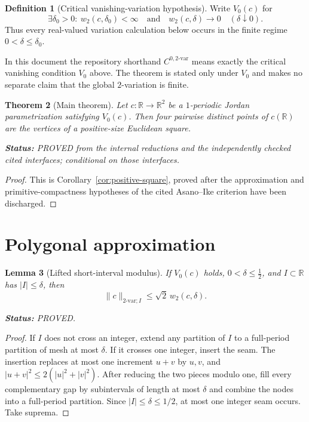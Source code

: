 \documentclass[11pt]{article}
\newtheorem{theorem}{Theorem}
\newtheorem{lemma}[theorem]{Lemma}
\theoremstyle{definition}
\newtheorem{definition}[theorem]{Definition}
\theoremstyle{remark}
\newcommand{\R}{\mathbb R}
\newcommand{\status}[1]{\par\smallskip\noindent\textbf{Status:}
  \begingroup\small\sffamily #1.\endgroup\par\smallskip}
\begin{document}
\begin{definition}[Critical vanishing-variation hypothesis]
Write $V_0(c)$ for
\[
 \exists\delta_0>0:\ w_2(c,\delta_0)<\infty
 \quad\text{and}\quad w_2(c,\delta)\longrightarrow0
                 \quad(\delta\downarrow0).
\]
Thus every real-valued variation calculation below occurs in the finite
regime $0<\delta\leq\delta_0$.
\end{definition}

In this document the repository shorthand $C^{0,2\text{-var}}$ means exactly
the critical vanishing condition $V_0$ above.  The theorem is stated only
under $V_0$ and makes no separate claim that the global $2$-variation is
finite.

\begin{theorem}[Main theorem]\label{thm:main}
Let $c\colon\R\to\R^2$ be a $1$-periodic Jordan parametrization satisfying
$V_0(c)$.  Then four pairwise distinct points of $c(\R)$ are the vertices of a
positive-size Euclidean square.
\status{PROVED from the internal reductions and the independently checked
cited interfaces; conditional on those interfaces}
\end{theorem}

\begin{proof}
This is Corollary~\ref{cor:positive-square}, proved after the
approximation and primitive-compactness hypotheses of the cited
Asano--Ike criterion have been discharged.
\end{proof}

\section{Polygonal approximation}

\begin{lemma}[Lifted short-interval modulus]\label{lem:local-modulus}
If $V_0(c)$ holds, $0<\delta\leq\tfrac12$, and $I\subset\R$ has
$|I|\leq\delta$, then
\[
       \|c\|_{2\text{-var};I}\leq\sqrt2\,w_2(c,\delta).
\]
\status{PROVED}
\end{lemma}

\begin{proof}
If $I$ does not cross an integer, extend any partition of $I$ to a
full-period partition of mesh at most $\delta$.  If it crosses one integer,
insert the seam.  The insertion replaces at most one increment $u+v$ by
$u,v$, and
\(
 |u+v|^2\leq2(|u|^2+|v|^2).
\)
After reducing the two pieces modulo one, fill every complementary gap by
subintervals of length at most $\delta$ and combine the nodes into a
full-period partition.  Since $|I|\leq\delta\leq1/2$, at most one integer
seam occurs.  Take suprema.
\end{proof}
\end{document}

